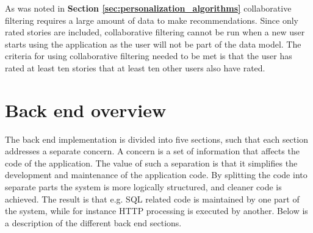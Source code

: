 As was noted in \textbf{Section \ref{sec:personalization_algorithms}} collaborative filtering requires a large amount of data to make recommendations. Since only rated stories are included, collaborative filtering cannot be run when a new user starts using the application as the user will not be part of the data model. The criteria for using collaborative filtering needed to be met is that the user has rated at least ten stories that at least ten other users also have rated. 

\section{Back end overview}
The back end implementation is divided into five sections, such that each section addresses a separate concern. A concern is a set of information that affects the code of the application. The value of such a separation is that it simplifies the development and maintenance of the application code. By splitting the code into separate parts the system is more logically structured, and cleaner code is achieved. The result is that e.g. SQL related code is maintained by one part of the system, while for instance HTTP processing is executed by another. Below is a description of the different back end sections.

